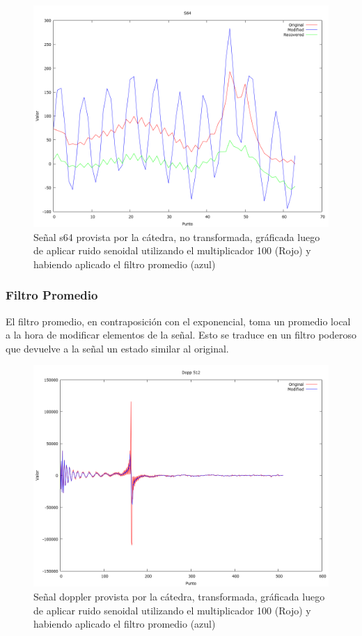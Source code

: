 \begin{figure}
\begin {center}
\includegraphics[width=360pt]{imagenes/s64-sin100-exp.png}
\end {center}
\caption{Se\~nal s64 provista por la c\'atedra, no transformada, gr\'aficada
luego de aplicar ruido senoidal utilizando el multiplicador 100 (Rojo) y 
habiendo aplicado el filtro promedio (azul)}
\label{fig:SinProm}
\end{figure}


\subsubsection{Filtro Promedio}

El filtro promedio, en contraposici\'on con el exponencial, toma un promedio
local a la hora de modificar elementos de la se\~nal. Esto se traduce en un
filtro poderoso que devuelve a la se\~nal un estado similar al original.

\begin{figure}
\begin {center}
\includegraphics[width=360pt]{imagenes/dopp512-sin100-avg-spec.png}
\end {center}
\caption{Se\~nal doppler provista por la c\'atedra, transformada, gr\'aficada
luego de aplicar ruido senoidal utilizando el multiplicador 100 (Rojo) y 
habiendo aplicado el filtro promedio (azul)}
\label{fig:SinProm}
\end{figure}

